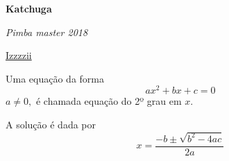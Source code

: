 \documentclass[a4paper, 12pt]{article}
\begin{document}
\begin{center}
\textbf{Katchuga}
\end{center}

\begin{flushright}
\textit{Pimba master 2018}
\end{flushright}

\begin{flushleft}
\underline{Izzzzii}
\end{flushleft}

Uma equação da forma 
$$ax^2 + bx + c = 0$$  $a \neq 0,$ 
é chamada equação do 2º grau em $x$.

A solução é dada por
$$ x = \frac{ -b \pm \sqrt{b^2 - 4ac} } {2a} $$
\end{document}
